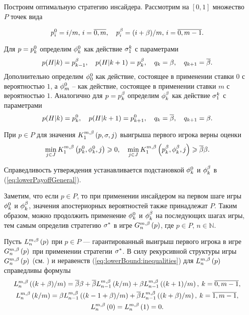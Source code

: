 Построим оптимальную стратегию инсайдера. Рассмотрим на $[0,1]$ множество $P$
точек вида

\[
\pEven[i] = i/m, \, i = \overline{0, m}, \quad \pOdd[i] = (i + \Co)/m, \, i =
\overline{0, m - 1}.
\]

Для $p = \pEven$ определим $\fEven$ как действие $\fGeneral{k}$ с параметрами
\begin{equation*}
  p(H|k) = \pOdd[k-1], \quad p(H|k + 1) = \pOdd[k], \quad q_k = \Co, \quad q_{k+1} = \DCo.
\end{equation*}
Дополнительно определим $\fEven[0]$ как действие, состоящее в применении ставки
$0$ с вероятностью $1$, а $\fEven[m]$ -- как действие, состоящее в применении
ставки $m$ с вероятностью $1$. Аналогично для $p = \pOdd$ определим $\fOdd$ как
действие $\fGeneral{k}$ с параметрами
\begin{equation*}
  p(H|k) = \pEven[k], \quad p(H|k + 1) = \pEven[k+1], \quad q_k = \DCo, \quad q_{k+1} = \Co.
\end{equation*}

\begin{proposition}
  При $p \in P$ для значения $\firstPlayerPayoff{1}{p}{\sigma}{j}$ выигрыша
  первого игрока верны оценки
  \begin{equation}
    \label{eq:lowerBound:inequalities}
    \min_{j \in J}
    \firstPlayerPayoff{1}{\pEven}{\fEven}{j} \geq 0,
    \quad
    \min_{j \in J}
    \firstPlayerPayoff{1}{\pOdd}{\fOdd}{j} \geq \DCo\Co.
  \end{equation}
\end{proposition}
Справедливость утверждения устанавливается подстановкой $\fEven$ и $\fOdd$ в
(\ref{eq:lowerPayoffGeneral}).

Заметим, что если $p \in P$, то при применении инсайдером на первом шаге игры
$\fEven$ и $\fOdd$, значения апостериорных вероятностей также принадлежат $P$.
Таким образом, можно продолжить применение $\fEven$ и $\fOdd$ на последующих
шагах игры, тем самым определив стратегию $\fOpt$ в игре $\generalGame{n}{p}$,
где $p \in P, \, n \in \mathbb{N}$.

Пусть $\lowerBound[n]{p}$ при $p \in P$ --- гарантированный выигрыш первого
игрока в игре $\generalGame{n}{p}$ при применении стратегии $\fOpt$. В силу
рекурсивной структуры игры $\generalGame{n}{p}$ (см. \cite{domansky07}) и
неравенств (\ref{eq:lowerBound:inequalities}) для $\lowerBound[n]{p}$
справедливы формулы
\begin{equation}
  \begin{gathered}
    \label{eq:lowerBound:recurrence:function}
    \lowerBound[n]{(k + \Co)/m} = \DCo\Co + \DCo\lowerBound[n-1]{k/m} +
    \Co\lowerBound[n-1]{(k + 1)/m}, \: k = \overline{0, m-1}, \\
    \lowerBound[n]{k/m} = \Co\lowerBound[n-1]{(k - 1 + \Co)/m} +
    \DCo\lowerBound[n-1]{(k + \Co)/m}, \: k = \overline{1, m-1}, \\
    \lowerBound[n]{0} = \lowerBound[n]{1} = 0.
  \end{gathered}
\end{equation}

